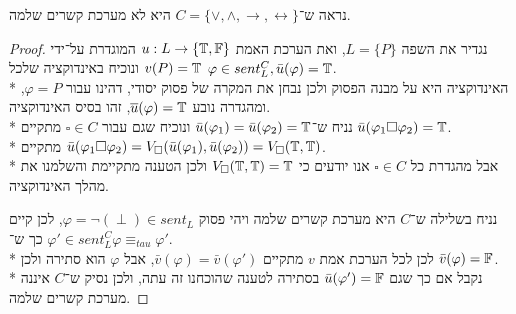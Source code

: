 \Subquestion{}
נראה ש־$C = \{ \lor, \land, \to, \leftrightarrow \}$ היא לא מערכת קשרים שלמה.
\begin{proof}
	נגדיר את השפה $L = \{ P \}$, ואת הערכת האמת $u : L \to \{ \mathbb{T}, \mathbb{F} \}$ המוגדרת על־ידי $v(P) = \mathbb{T}$ ונוכיח באינדוקציה שלכל $\varphi \in sent_L^C, \bar{u}(\varphi) = \mathbb{T}$. \\*
	האינדוקציה היא על מבנה הפסוק ולכן נבחן את המקרה של פסוק יסודי, דהינו עבור $\varphi = P$, ומהגדרה נובע $\overline{u}(\varphi) = \mathbb{T}$, זהו בסיס האינדוקציה. \\*
	נניח ש־$\bar{u}(\varphi_1) = \bar{u}(\varphi_2) = \mathbb{T}$ ונוכיח שגם עבור $\square \in C$ מתקיים $\bar{u}(\varphi_1 \square \varphi_2) = \mathbb{T}$. \\*
	מתקיים $\bar{u}(\varphi_1 \square \varphi_2) = V_\square(\bar{u}(\varphi_1), \bar{u}(\varphi_2)) = V_\square(\mathbb{T}, \mathbb{T})$. \\*
	אבל מהגדרת כל $\square \in C$ אנו יודעים כי $V_\square(\mathbb{T}, \mathbb{T}) = \mathbb{T}$ ולכן הטענה מתקיימת והשלמנו את מהלך האינדוקציה.

	נניח בשלילה ש־$C$ היא מערכת קשרים שלמה ויהי פסוק $\varphi = \lnot (\perp) \in sent_L$, לכן קיים $\varphi' \in sent_L^C$ כך ש־$\varphi \equiv_{tau} \varphi'$. \\*
	לכן לכל הערכת אמת $v$ מתקיים $\bar{v}(\varphi) = \bar{v}(\varphi')$, אבל $\varphi$ הוא סתירה ולכן $\bar{v}(\varphi) = \mathbb{F}$. \\*
	נקבל אם כך שגם $\bar{u}(\varphi') = \mathbb{F}$ בסתירה לטענה שהוכחנו זה עתה, ולכן נסיק ש־$C$ איננה מערכת קשרים שלמה.
\end{proof}

